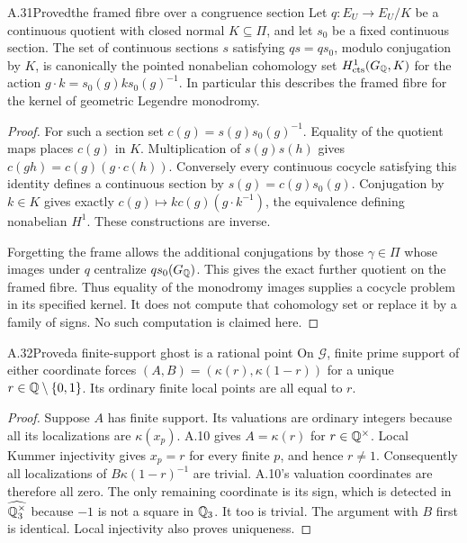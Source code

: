 \begin{statement}{A.31}{Proved}{the framed fibre over a congruence section}
Let $q:E_U\to E_U/K$ be a continuous quotient with closed normal
$K\subseteq\Pi$, and let $s_0$ be a fixed continuous section.
The set of continuous sections $s$ satisfying $qs=qs_0$, modulo
conjugation by $K$, is canonically the pointed nonabelian cohomology
set $H^1_{\rm cts}(G_\mathbb Q,K)$ for the action
$g\cdot k=s_0(g)ks_0(g)^{-1}$. In particular this describes the
framed fibre for the kernel of geometric Legendre monodromy.
\end{statement}
\begin{proof}
For such a section set $c(g)=s(g)s_0(g)^{-1}$. Equality of the
quotient maps places $c(g)$ in $K$. Multiplication of $s(g)s(h)$
gives $c(gh)=c(g)(g\cdot c(h))$. Conversely every continuous
cocycle satisfying this identity defines a continuous section by
$s(g)=c(g)s_0(g)$. Conjugation by $k\in K$ gives exactly
$c(g)\mapsto k c(g)(g\cdot k^{-1})$, the equivalence defining
nonabelian $H^1$. These constructions are inverse.

Forgetting the frame allows the additional conjugations by those
$\gamma\in\Pi$ whose images under $q$ centralize $qs_0(G_\mathbb Q)$.
This gives the exact further quotient on the framed fibre. Thus
equality of the monodromy images supplies a cocycle problem in its
specified kernel. It does not compute that cohomology set or replace
it by a family of signs. No such computation is claimed here.
\end{proof}

\begin{statement}{A.32}{Proved}{a finite-support ghost is a rational point}
On $\mathcal G$, finite prime support of either coordinate forces
$(A,B)=(\kappa(r),\kappa(1-r))$ for a unique
$r\in\mathbb Q\setminus\{0,1\}$. Its ordinary finite local points are all
equal to $r$.
\end{statement}
\begin{proof}
Suppose $A$ has finite support. Its valuations are ordinary integers
because all its localizations are $\kappa(x_p)$. A.10 gives
$A=\kappa(r)$ for $r\in\mathbb Q^\times$. Local Kummer injectivity gives
$x_p=r$ for every finite $p$, and hence $r\ne1$. Consequently all
localizations of $B\kappa(1-r)^{-1}$ are trivial. A.10's valuation
coordinates are therefore all zero. The only remaining coordinate
is its sign, which is detected in $\widehat{\mathbb Q_3^\times}$ because
$-1$ is not a square in $\mathbb Q_3$. It too is trivial. The argument with
$B$ first is identical. Local injectivity also proves uniqueness.
\end{proof}


